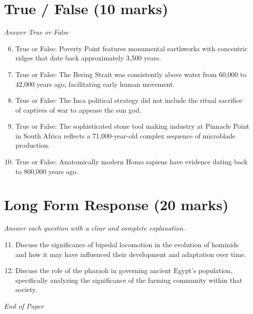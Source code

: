 \documentclass[12pt]{article}
\begin{document}
\section*{True / False (10 marks)}
\textit{Answer True or False}
\begin{enumerate}[label=\arabic*.]
\setcounter{enumi}{5}
\item True or False: Poverty Point features monumental earthworks with concentric ridges that date back approximately 3,500 years.
\item True or False: The Bering Strait was consistently above water from 60,000 to 42,000 years ago, facilitating early human movement.
\item True or False: The Inca political strategy did not include the ritual sacrifice of captives of war to appease the sun god.
\item True or False: The sophisticated stone tool making industry at Pinnacle Point in South Africa reflects a 71,000-year-old complex sequence of microblade production.
\item True or False: Anatomically modern Homo sapiens have evidence dating back to 800,000 years ago.
\end{enumerate}

\section*{Long Form Response (20 marks)}
\textit{Answer each question with a clear and complete explanation.}
\begin{enumerate}[label=\arabic*.]
\setcounter{enumi}{10}
\item Discuss the significance of bipedal locomotion in the evolution of hominids and how it may have influenced their development and adaptation over time.
\item Discuss the role of the pharaoh in governing ancient Egypt's population, specifically analyzing the significance of the farming community within that society.
\end{enumerate}

\vfill
\noindent\textit{End of Paper}
\end{document}
